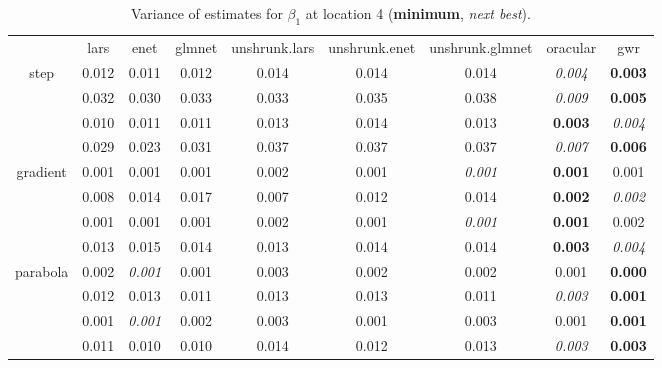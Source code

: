 \documentclass[authoryear, review, 11pt]{elsarticle}
\begin{document}
\begin{table}[ht]
\begin{center}
\begin{tabular}{ccccccccc}
  & lars & enet & glmnet & unshrunk.lars & unshrunk.enet & unshrunk.glmnet & oracular & gwr \\ 
  \cline{2-9}
  \multirow{4}{*}{step} & 0.012 & 0.011 & 0.012 & 0.014 & 0.014 & 0.014 & \emph{0.004} & \textbf{0.003} \\ 
  & 0.032 & 0.030 & 0.033 & 0.033 & 0.035 & 0.038 & \emph{0.009} & \textbf{0.005} \\ 
  & 0.010 & 0.011 & 0.011 & 0.013 & 0.014 & 0.013 & \textbf{0.003} & \emph{0.004} \\ 
  & 0.029 & 0.023 & 0.031 & 0.037 & 0.037 & 0.037 & \emph{0.007} & \textbf{0.006} \\ 
  \cline{2-9}
  \multirow{4}{*}{gradient} & 0.001 & 0.001 & 0.001 & 0.002 & 0.001 & \emph{0.001} & \textbf{0.001} & 0.001 \\ 
  & 0.008 & 0.014 & 0.017 & 0.007 & 0.012 & 0.014 & \textbf{0.002} & \emph{0.002} \\ 
  & 0.001 & 0.001 & 0.001 & 0.002 & 0.001 & \emph{0.001} & \textbf{0.001} & 0.002 \\ 
  & 0.013 & 0.015 & 0.014 & 0.013 & 0.014 & 0.014 & \textbf{0.003} & \emph{0.004} \\ 
  \cline{2-9}
  \multirow{4}{*}{parabola} & 0.002 & \emph{0.001} & 0.001 & 0.003 & 0.002 & 0.002 & 0.001 & \textbf{0.000} \\ 
  & 0.012 & 0.013 & 0.011 & 0.013 & 0.013 & 0.011 & \emph{0.003} & \textbf{0.001} \\ 
  & 0.001 & \emph{0.001} & 0.002 & 0.003 & 0.001 & 0.003 & 0.001 & \textbf{0.001} \\ 
  & 0.011 & 0.010 & 0.010 & 0.014 & 0.012 & 0.013 & \emph{0.003} & \textbf{0.003} \\ 
  \end{tabular}
\caption{Variance of estimates for $\beta_1$ at location 4 (\textbf{minimum}, \emph{next best}).\label{table:loc4-X1-varx}}
\end{center}
\end{table}
\end{document}
